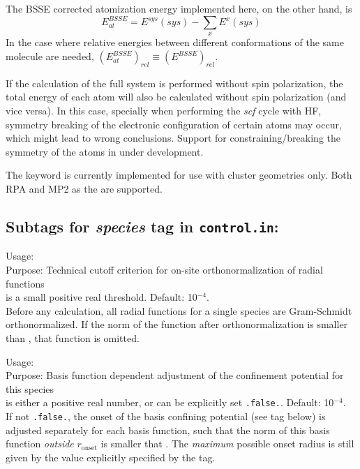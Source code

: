 The BSSE corrected atomization energy implemented here, on the other hand, is 
\begin{equation}
  E^{BSSE}_{at}=E^{sys}(sys)-\sum_x E^x(sys)
\end{equation}
In the case where relative energies between different conformations of the same molecule are needed, $(E^{BSSE}_{at})_{rel}\equiv(E^{BSSE})_{rel}$.

If the calculation of the full system is performed without spin polarization, the total energy of each atom will also be calculated without spin polarization (and vice versa). In this case, specially when performing the \textit{scf} cycle with HF, symmetry breaking of the electronic configuration of certain atoms may occur, which might lead to wrong conclusions. Support for constraining/breaking the symmetry of the atoms in under development.

The keyword is currently implemented for use with cluster geometries only. Both RPA and MP2 as the  are supported.

\newpage

\subsection*{Subtags for \emph{species} tag in \texttt{control.in}:}

{
  \noindent
  Usage:   \\[1.0ex]
  Purpose: Technical cutoff criterion for on-site orthonormalization
    of radial functions \\[1.0ex]
   is a small positive real threshold. Default:
  10$^{-4}$. \\
}
Before any calculation, all radial functions for a single species are
Gram-Schmidt orthonormalized. If the norm of the function after
  orthonormalization is smaller than , that function
  is omitted.

{
  \noindent
  Usage:   \\[1.0ex]
  Purpose: Basis function dependent adjustment of the confinement
  potential for this species \\[1.0ex]
   is either a positive real number, or can be
  explicitly set \texttt{.false.}. Default: 10$^{-4}$. \\
}
If not \texttt{.false.}, the onset of the basis confining potential
(see  tag below) is adjusted separately
  for each basis function, such that the norm of this basis function
  \emph{outside} $r_\text{onset}$ is smaller that
  . The \emph{maximum} possible onset radius is
  still given by the value explicitly specified by the
   tag. 

